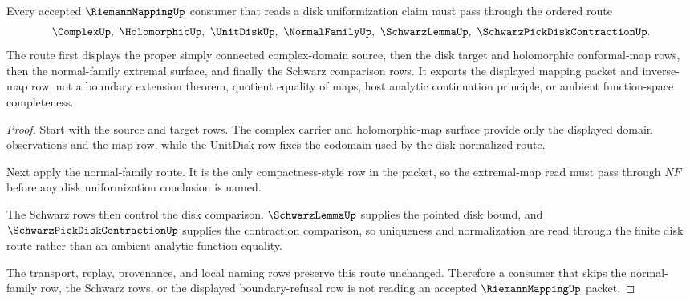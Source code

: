 \begin{theorem}
\label{thm:riemann-mapping-normal-family-route}
Every accepted $\RiemannMappingUp$ consumer that reads a disk uniformization claim must pass through the ordered route
$$
\ComplexUp,\ \HolomorphicUp,\ \UnitDiskUp,\ \NormalFamilyUp,\ \SchwarzLemmaUp,\ \SchwarzPickDiskContractionUp .
$$
The route first displays the proper simply connected complex-domain source, then the disk target and holomorphic conformal-map rows, then the normal-family extremal surface, and finally the Schwarz comparison rows. It exports the displayed mapping packet and inverse-map row, not a boundary extension theorem, quotient equality of maps, host analytic continuation principle, or ambient function-space completeness.
\end{theorem}
\begin{proof}
Start with the source and target rows. The complex carrier and holomorphic-map surface provide only the displayed domain observations and the map row, while the UnitDisk row fixes the codomain used by the disk-normalized route.

Next apply the normal-family route. It is the only compactness-style row in the packet, so the extremal-map read must pass through $NF$ before any disk uniformization conclusion is named.

The Schwarz rows then control the disk comparison. $\SchwarzLemmaUp$ supplies the pointed disk bound, and $\SchwarzPickDiskContractionUp$ supplies the contraction comparison, so uniqueness and normalization are read through the finite disk route rather than an ambient analytic-function equality.

The transport, replay, provenance, and local naming rows preserve this route unchanged. Therefore a consumer that skips the normal-family row, the Schwarz rows, or the displayed boundary-refusal row is not reading an accepted $\RiemannMappingUp$ packet.
\end{proof}



